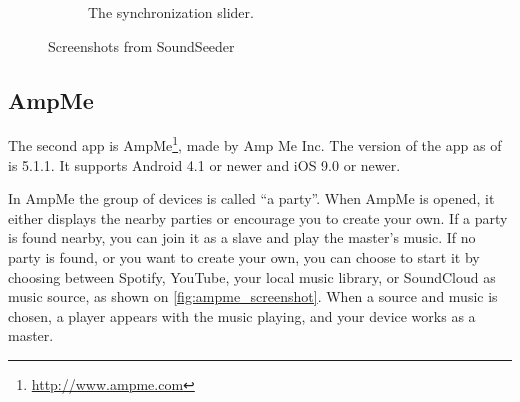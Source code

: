 \begin{figure}[h!]
\begin{subfigure}[b]{0.45\textwidth}
        \caption{The synchronization slider.}\label{fig:soundseeder_slider}
    \end{subfigure}
    \caption{Screenshots from SoundSeeder}\label{fig:soundseeder_screenshots}
\end{figure}

\subsection{AmpMe}\label{subsec:ampme}
The second app is AmpMe\footnote{\url{http://www.ampme.com}}, made by Amp Me Inc.
The version of the app as of  is 5.1.1.
It supports Android 4.1 or newer and iOS 9.0 or newer.

In AmpMe the group of devices is called ``a party''.
When AmpMe is opened, it either displays the nearby parties or encourage you to create your own.
If a party is found nearby, you can join it as a slave and play the master's music.
If no party is found, or you want to create your own, you can choose to start it by choosing between Spotify,
YouTube, your local music library, or SoundCloud as music source, as shown on \cref{fig:ampme_screenshot}.
When a source and music is chosen, a player appears with the music playing, and your device works as a master.

